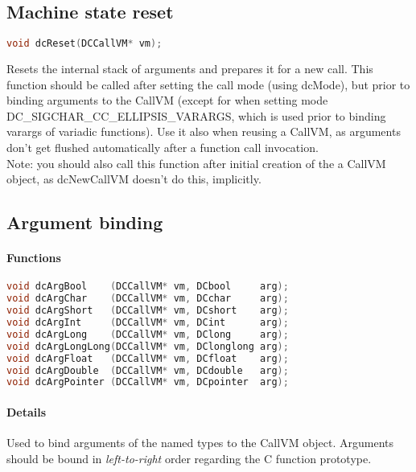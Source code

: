 \subsection{Machine state reset}

\begin{lstlisting}[language=c]
void dcReset(DCCallVM* vm);
\end{lstlisting}

Resets the internal stack of arguments and prepares it for a new call. This
function should be called after setting the call mode (using dcMode), but prior
to binding arguments to the CallVM (except for when setting mode
DC\_SIGCHAR\_CC\_ELLIPSIS\_VARARGS, which is used prior to binding varargs of
variadic functions). Use it also when reusing a CallVM, as arguments don't get
flushed automatically after a function call invocation.\\
Note: you should also call this function after initial creation of the a CallVM
object, as dcNewCallVM doesn't do this, implicitly.\\

\subsection{Argument binding}

\paragraph{Functions}

\begin{lstlisting}[language=c]
void dcArgBool    (DCCallVM* vm, DCbool     arg);
void dcArgChar    (DCCallVM* vm, DCchar     arg);
void dcArgShort   (DCCallVM* vm, DCshort    arg);
void dcArgInt     (DCCallVM* vm, DCint      arg);
void dcArgLong    (DCCallVM* vm, DClong     arg);
void dcArgLongLong(DCCallVM* vm, DClonglong arg);
void dcArgFloat   (DCCallVM* vm, DCfloat    arg);
void dcArgDouble  (DCCallVM* vm, DCdouble   arg);
void dcArgPointer (DCCallVM* vm, DCpointer  arg);
\end{lstlisting}

\paragraph{Details}

Used to bind arguments of the named types to the CallVM object.
Arguments should be bound in \emph{left-to-right} order regarding the C
function prototype.\\

